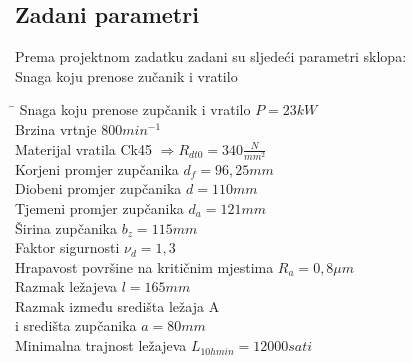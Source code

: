 \documentclass[12pt,a4paper]{article}
\begin{document}
\subsection{Zadani parametri}
Prema projektnom zadatku zadani su sljedeći parametri sklopa:\\
Snaga koju prenose zučanik i vratilo
\begin{tabbing}
\hspace{260pt}\=\kill
 Snaga koju prenose zupčanik i vratilo \> $P=23 kW$ \\ 
 Brzina vrtnje \> $800 min^{-1}$ \\ 
 Materijal vratila \> Ck45 $\Rightarrow R_{dt0}=340 \frac {N}{mm^2}$ \\ 
 Korjeni promjer zupčanika \> $d_f=96,25mm$ \\ 
 Diobeni promjer zupčanika \> $d=110mm$ \\ 
 Tjemeni promjer zupčanika \> $d_a=121mm$ \\ 
 Širina zupčanika \> $b_z=115mm$ \\ 
 Faktor sigurnosti \> $\nu_d=1,3$ \\ 
 Hrapavost površine na kritičnim mjestima \> $R_a=0,8\mu m$ \\ 
 Razmak ležajeva \> $l=165mm$ \\ 
 Razmak između središta ležaja A\\ i središta zupčanika \> $a=80mm$ \\ 
 Minimalna trajnost ležajeva \> $L_{10h min}=12000 sati$
\end{tabbing}
 
\end{document}
